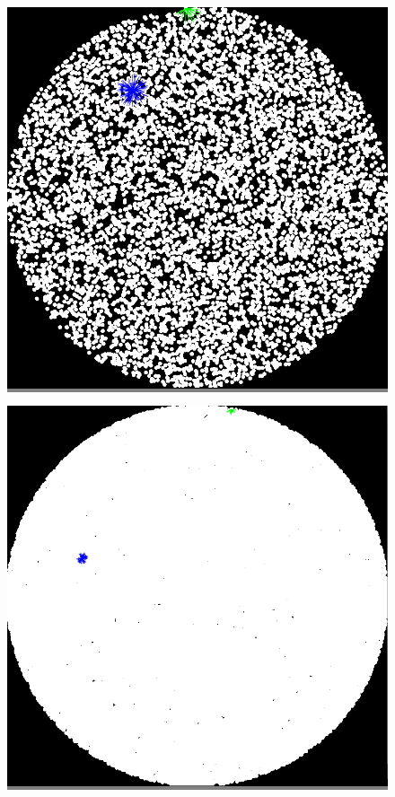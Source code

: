 \documentclass{article}
\begin{document}
\begin{figure}
    \begin{minipage}{0.45\textwidth}
    \colorbox{gray}{\includegraphics[width=\linewidth]{./images/disk_0.png}}
    \end{minipage}
    \hspace{\fill}
    \begin{minipage}{0.45\textwidth}
    \colorbox{gray}{\includegraphics[width=\linewidth]{./images/disk_1.png}}

\end{minipage}
\end{figure}
\end{document}

